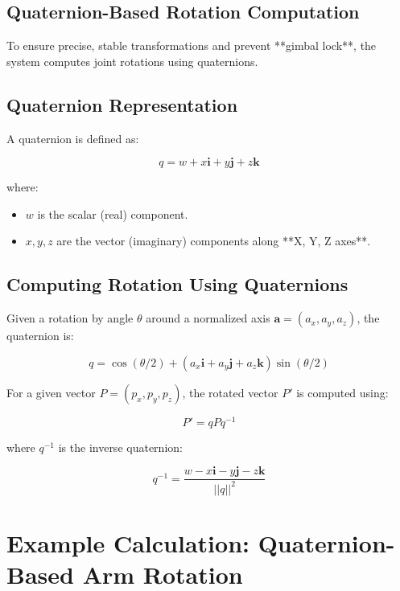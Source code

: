 \documentclass{article}
\begin{document}
\subsection{Quaternion-Based Rotation Computation}
To ensure precise, stable transformations and prevent **gimbal lock**, the system computes joint rotations using quaternions.

\subsection{Quaternion Representation}
A quaternion is defined as:



\[
q = w + x\mathbf{i} + y\mathbf{j} + z\mathbf{k}
\]



where:
\begin{itemize}
    \item \( w \) is the scalar (real) component.
    \item \( x, y, z \) are the vector (imaginary) components along **X, Y, Z axes**.
\end{itemize}

\subsection{Computing Rotation Using Quaternions}
Given a rotation by angle \( \theta \) around a normalized axis \( \mathbf{a} = (a_x, a_y, a_z) \), the quaternion is:



\[
q = \cos(\theta/2) + (a_x\mathbf{i} + a_y\mathbf{j} + a_z\mathbf{k}) \sin(\theta/2)
\]



For a given vector \( P = (p_x, p_y, p_z) \), the rotated vector \( P' \) is computed using:



\[
P' = q P q^{-1}
\]



where \( q^{-1} \) is the inverse quaternion:



\[
q^{-1} = \frac{w - x\mathbf{i} - y\mathbf{j} - z\mathbf{k}}{||q||^2}
\]



\section{Example Calculation: Quaternion-Based Arm Rotation}
\end{document}
